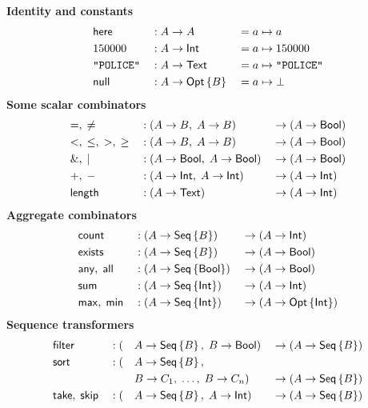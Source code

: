 
\begin{table}
    \begin{framed}
    \textbf{Identity and constants}
    \begin{alignat*}{3}
        & \textup{\textsf{here}} && : A \to A && = a \mapsto a \\
        & 150000 && : A \to \textup{\textsf{Int}} && = a \mapsto 150000 \\
        & \texttt{"POLICE"} && : A \to \textup{\textsf{Text}} && = a \mapsto \texttt{"POLICE"} \\
        & \textup{\textsf{null}} && : A \to \textup{\textsf{Opt}}\left\{B\right\} && = a \mapsto \bot
    \end{alignat*}
    \textbf{Some scalar combinators}
    \begin{alignat*}{3}
        & {=},\;{\ne} && : (A \to B,\; A \to B) && \to (A \to \textup{\textsf{Bool}}) \\
        & {<},\;{\le},\;{>},\;{\ge} && : (A \to B,\; A \to B) && \to (A \to \textup{\textsf{Bool}}) \\
        & {\&},\;{|} && : (A \to \textup{\textsf{Bool}},\; A \to \textup{\textsf{Bool}}) && \to (A \to \textup{\textsf{Bool}}) \\
        & {+},\;{-} && : (A \to \textup{\textsf{Int}},\; A \to \textup{\textsf{Int}}) && \to (A \to \textup{\textsf{Int}}) \\
        & \textup{\textsf{length}} && : (A \to \textup{\textsf{Text}}) && \to (A \to \textup{\textsf{Int}})
    \end{alignat*}
    \textbf{Aggregate combinators}
    \begin{alignat*}{3}
        & \textup{\textsf{count}} && : (A \to \textup{\textsf{Seq}}\left\{B\right\}) && \to (A \to \textup{\textsf{Int}}) \\
        & \textup{\textsf{exists}} && : (A \to \textup{\textsf{Seq}}\left\{B\right\}) && \to (A \to \textup{\textsf{Bool}}) \\
        & \textup{\textsf{any}},\; \textup{\textsf{all}} && : (A \to \textup{\textsf{Seq}}\left\{\textup{\textsf{Bool}}\right\}) && \to (A \to \textup{\textsf{Bool}}) \\
        & \textup{\textsf{sum}} && : (A \to \textup{\textsf{Seq}}\left\{\textup{\textsf{Int}}\right\}) && \to (A \to \textup{\textsf{Int}}) \\
        & \textup{\textsf{max}},\; \textup{\textsf{min}} && : (A \to \textup{\textsf{Seq}}\left\{\textup{\textsf{Int}}\right\}) && \to (A \to \textup{\textsf{Opt}}\left\{\textup{\textsf{Int}}\right\})
    \end{alignat*}
    \textbf{Sequence transformers}
    \begin{alignat*}{4}
        & \Filter && : (&& A \to \Seq{B},\; B \to \Bool) && \to (A \to \Seq{B}) \\
        & \Sort && : (&& A \to \Seq{B},\; && \\
        & && && B \to C_1,\; \ldots,\; B \to C_n) && \to (A \to \Seq{B}) \\
        & \Take,\; \Skip && : (&& A \to \Seq{B},\; A \to \Int) && \to (A \to \Seq{B}) \\

\end{alignat*}
\end{framed}
\end{table}
